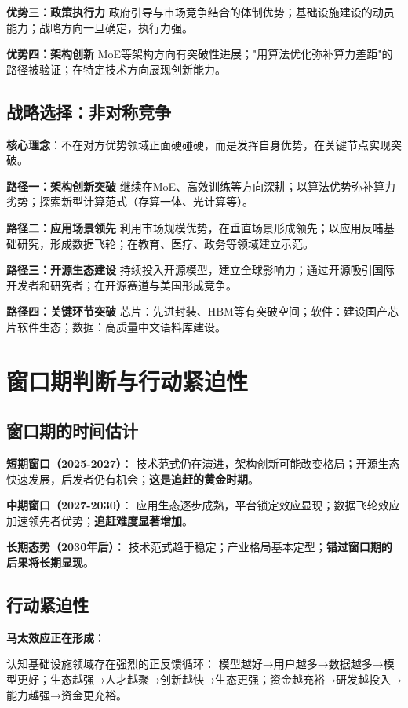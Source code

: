 \textbf{优势三：政策执行力}
政府引导与市场竞争结合的体制优势；基础设施建设的动员能力；战略方向一旦确定，执行力强。

\textbf{优势四：架构创新}
MoE等架构方向有突破性进展；"用算法优化弥补算力差距"的路径被验证；在特定技术方向展现创新能力。

\subsection{战略选择：非对称竞争}

\textbf{核心理念}：不在对方优势领域正面硬碰硬，而是发挥自身优势，在关键节点实现突破。

\textbf{路径一：架构创新突破}
继续在MoE、高效训练等方向深耕；以算法优势弥补算力劣势；探索新型计算范式（存算一体、光计算等）。

\textbf{路径二：应用场景领先}
利用市场规模优势，在垂直场景形成领先；以应用反哺基础研究，形成数据飞轮；在教育、医疗、政务等领域建立示范。

\textbf{路径三：开源生态建设}
持续投入开源模型，建立全球影响力；通过开源吸引国际开发者和研究者；在开源赛道与美国形成竞争。

\textbf{路径四：关键环节突破}
芯片：先进封装、HBM等有突破空间；软件：建设国产芯片软件生态；数据：高质量中文语料库建设。

\section{窗口期判断与行动紧迫性}

\subsection{窗口期的时间估计}

\textbf{短期窗口（2025-2027）}：
技术范式仍在演进，架构创新可能改变格局；开源生态快速发展，后发者仍有机会；\textbf{这是追赶的黄金时期}。

\textbf{中期窗口（2027-2030）}：
应用生态逐步成熟，平台锁定效应显现；数据飞轮效应加速领先者优势；\textbf{追赶难度显著增加}。

\textbf{长期态势（2030年后）}：
技术范式趋于稳定；产业格局基本定型；\textbf{错过窗口期的后果将长期显现}。

\subsection{行动紧迫性}

\textbf{马太效应正在形成}：

认知基础设施领域存在强烈的正反馈循环：
模型越好→用户越多→数据越多→模型更好；生态越强→人才越聚→创新越快→生态更强；资金越充裕→研发越投入→能力越强→资金更充裕。

